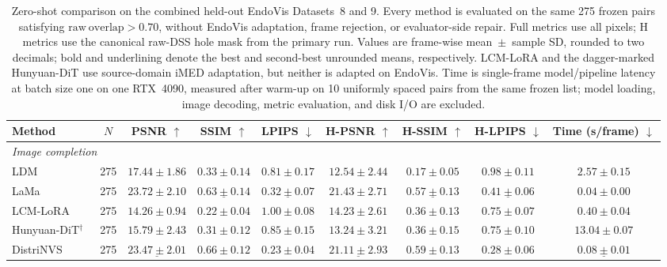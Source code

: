 \documentclass[letterpaper,10pt,conference]{ieeeconf}
\begin{document}
\begin{table}[t]
\centering
\caption{Zero-shot comparison on the combined held-out EndoVis Datasets~8 and
9. Every method is evaluated on the same 275 frozen pairs satisfying
$\mathrm{raw\ overlap}>0.70$, without EndoVis adaptation, frame rejection, or
evaluator-side repair. Full metrics use all pixels; H metrics use the canonical
raw-DSS hole mask from the primary run. Values are frame-wise mean~$\pm$~sample
SD, rounded to two decimals; bold and underlining denote the best and
second-best unrounded means, respectively. LCM-LoRA
and the dagger-marked Hunyuan-DiT use source-domain iMED adaptation, but
neither is adapted on EndoVis. Time is single-frame model/pipeline latency at
batch size one on one RTX~4090, measured after warm-up on 10 uniformly spaced
pairs from the same frozen list; model loading, image decoding, metric
evaluation, and disk I/O are excluded.}
\label{tab:zeroshot-breakdown}
\small
\setlength{\tabcolsep}{1.5pt}
\begin{tabular}{lcccccccc}
\toprule
Method & $N$ & PSNR $\uparrow$ & SSIM $\uparrow$ & LPIPS $\downarrow$ &
H-PSNR $\uparrow$ & H-SSIM $\uparrow$ & H-LPIPS $\downarrow$ &
Time (s/frame) $\downarrow$ \\
\midrule
\multicolumn{9}{l}{\textit{Image completion}} \\
LDM~\cite{rombach2022ldm} & 275 & $17.44\pm1.86$ & $0.33\pm0.14$ &
$0.81\pm0.17$ & $12.54\pm2.44$ & $0.17\pm0.05$ & $0.98\pm0.11$ &
$2.57\pm0.15$ \\
LaMa~\cite{suvorov2022lama} & 275 & $\mathbf{23.72\pm2.10}$ &
$\underline{0.63\pm0.14}$ & $\underline{0.32\pm0.07}$ &
$\mathbf{21.43\pm2.71}$ & $\underline{0.57\pm0.13}$ &
$\underline{0.41\pm0.06}$ & $\mathbf{0.04\pm0.00}$ \\
LCM-LoRA~\cite{luo2023lcmlora} & 275 & $14.26\pm0.94$ & $0.22\pm0.04$ &
$1.00\pm0.08$ & $14.23\pm2.61$ & $0.36\pm0.13$ & $0.75\pm0.07$ &
$0.40\pm0.04$ \\
Hunyuan-DiT$^\dagger$~\cite{li2024hunyuandit} & 275 & $15.79\pm2.43$ &
$0.31\pm0.12$ & $0.85\pm0.15$ & $13.24\pm3.21$ & $0.36\pm0.15$ &
$0.75\pm0.10$ & $13.04\pm0.07$ \\
\midrule
DistriNVS & 275 & $\underline{23.47\pm2.01}$ &
$\mathbf{0.66\pm0.12}$ & $\mathbf{0.23\pm0.04}$ &
$\underline{21.11\pm2.93}$ & $\mathbf{0.59\pm0.13}$ &
$\mathbf{0.28\pm0.06}$ & $\underline{0.08\pm0.01}$ \\
\bottomrule
\end{tabular}
\end{table}
\end{document}
